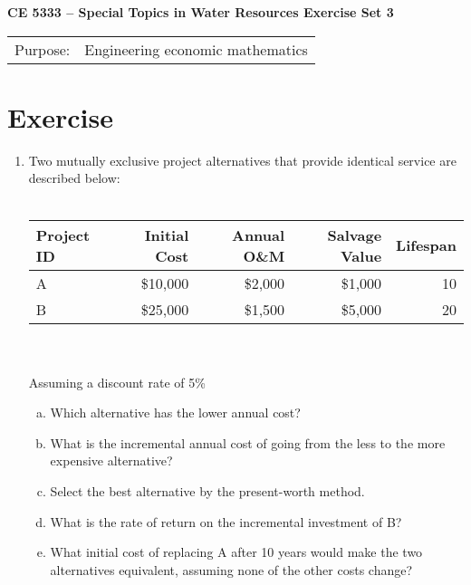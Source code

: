 \documentclass[12pt]{article}
\begin{document}
\begin{center}
{\textbf{{ CE 5333 -- Special Topics in Water Resources}  {Exercise Set 3}}}
\end{center}
\begingroup
\begin{tabular}{p{1in} p{5in}}
Purpose: & Engineering economic mathematics \\
\end{tabular}
\endgroup
\section*{\small{Exercise}}
\begin{enumerate}
\item Two mutually exclusive project alternatives that provide identical service are described below: \\~\\
\begin{tabular}{lrrrr}
Project ID & Initial Cost & Annual O\&M & Salvage Value & Lifespan \\
\hline
\hline
A & \$10,000 & \$2,000 & \$1,000 & 10  \\
B & \$25,000 & \$1,500 & \$5,000 & 20  \\
\end{tabular}\\~\\
Assuming a discount rate of 5\% 
\begin{enumerate}[a)]
\item Which alternative has the lower annual cost?
\item What is the incremental annual cost of going from the less to the more expensive alternative?
\item Select the best alternative by the present-worth method.
\item What is the rate of return on the incremental investment of B?
\item What initial cost of replacing A after 10 years would make the two alternatives equivalent, assuming none of the other costs change?

\end{enumerate}
\end{enumerate}
\end{document}
